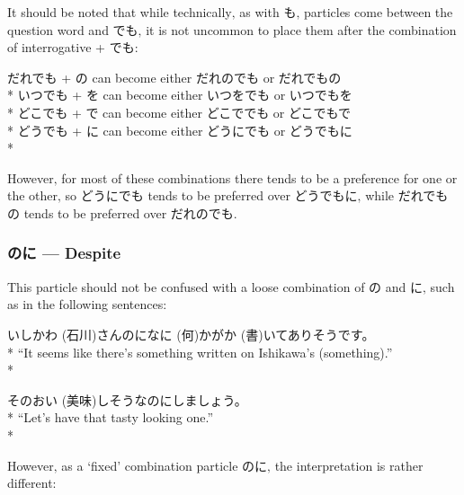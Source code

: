 \documentclass[11pt, b5paper, twoside, openright, onecolumn]{book}
\makeatletter
\newcommand*{\rubystack}[2]{{\relscale{0.5}%
  \begin{tabular}[b]{@{}c@{}}%
    {#1}\\%
   {\textscale{2}{#2}}%
  \end{tabular}}%
}
\DeclareRobustCommand*{\ruby}[2]{%
  \mbox{%
    \setlength{\parskip}{0ex}%
    \BeginAccSupp{method=pdfstringdef,ActualText={#1}}%
      \rubystack{\phantom{#2}}{#1}%
      \llap{%
        \rubystack{#2}{\phantom{#1}}%
      }%
    \EndAccSupp{}%
  }%
}
\renewcommand*{\ruby}[2]{#2 (#1)}%
\newenvironment{exampleblock}{
\setlength{\parindent}{0.6in}
\begin{minipage}[t]{\dimexpr\textwidth-\parindent}}
{\end{minipage}}
\makeatother
\begin{document}
It should be noted that while technically‚ as with も‚ particles come between the question word and でも‚ it is not uncommon to place them after the combination of interrogative + でも:

\vspace{0.4cm}
\begin{exampleblock}
だれでも + の can become either だれのでも or だれでもの \\* 
いつでも + を can become either いつをでも or いつでもを \\* 
どこでも + で can become either どこででも or どこでもで \\* 
どうでも + に can become either どうにでも or どうでもに \\* 
\end{exampleblock}
\vspace{0.2cm}

However‚ for most of these combinations there tends to be a preference for one or the other‚ so どうにでも tends to be preferred over どうでもに‚ while だれでもの tends to be preferred over だれのでも.

\subsubsection{のに — Despite}

This particle should not be confused with a loose combination of の and に‚ such as in the following sentences:

\vspace{0.4cm}
\begin{exampleblock}
\ruby{石川}{いしかわ}さんのに\ruby{何}{なに}かが\ruby{書}{か}いてありそうです。 \\* 
“It seems like there’s something written on Ishikawa’s (something).” \\* 
\end{exampleblock}
\vspace{0.2cm}

\begin{exampleblock}
その\ruby{美味}{おい}しそうなのにしましょう。 \\* 
“Let’s have that tasty looking one.” \\* 
\end{exampleblock}
\vspace{0.2cm}

However‚ as a ‘fixed’ combination particle のに‚ the interpretation is rather different:
\end{document}

